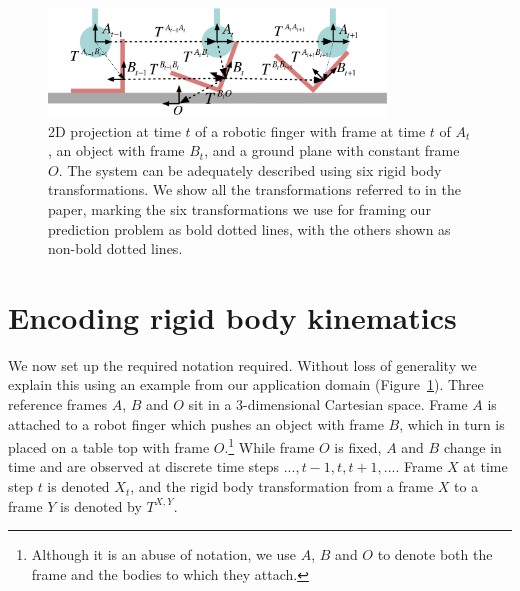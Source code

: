 \begin{figure}[t!]
\centerline{\includegraphics[width=0.8\textwidth]{sequential-frames}
}
\caption[Setup1]{2D projection at time $t$ of a robotic finger with frame at time $t$ of $A_{t}$,
an object with frame $B_{t}$, and a ground plane with constant frame
$O$. The system can be adequately described using six rigid body transformations. We show all the transformations referred to in the paper, marking the six transformations we use for framing our prediction problem as bold dotted lines, with the others shown as non-bold dotted lines. %
}
\label{fig:Learning.setup1}
\end{figure}

\section{Encoding rigid body kinematics}
\label{sec:Representations}

We now set up the required notation required. Without loss of generality we explain this using an example from our application domain
(Figure~\ref{fig:Learning.setup1}). Three reference frames $A$, $B$
and $O$ sit in a $3$\nobreakdash-\hspace{0pt}dimensional Cartesian
space. Frame $A$ is attached to a robot finger which pushes an object with frame $B$, which in turn is placed on a table top with frame
$O$.\footnote{Although it is an abuse of notation, we
  use $A$, $B$ and $O$ to denote both the frame and the bodies to which they attach.} While frame $O$ is fixed, $A$ and $B$ change in time and are observed at discrete time steps $..., t-1, t, t+1, ...$.  Frame $X$ at
time step $t$ is denoted $X_t$, and the rigid body transformation
from a frame $X$ to a frame $Y$ is denoted by $T^{X, Y}$.

